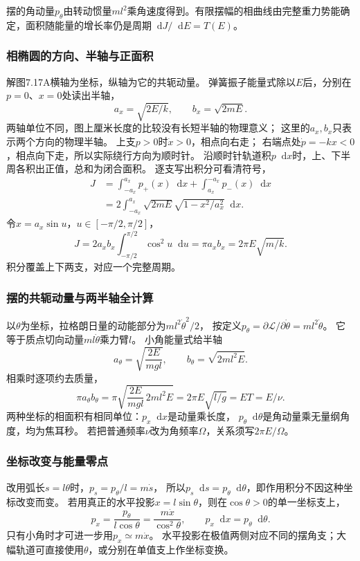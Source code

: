 \documentclass[UTF8,fontset=fandol,a4paper,11pt]{ctexart}
\newcommand{\dd}{\mathop{}\!\mathrm{d}}
\begin{document}
摆的角动量$p_\theta$由转动惯量$ml^2$乘角速度得到。有限摆幅的相曲线由完整重力势能确定，面积随能量的增长率仍是周期$\dd J/\dd E=T(E)$。
\subsubsection*{相椭圆的方向、半轴与正面积}
解图7.17A横轴为坐标，纵轴为它的共轭动量。
弹簧振子能量式除以$E$后，分别在$p=0$、$x=0$处读出半轴，
\[
a_x=\sqrt{2E/k},\qquad b_x=\sqrt{2mE}.
\]
两轴单位不同，图上厘米长度的比较没有长短半轴的物理意义；
这里的$a_x,b_x$只表示两个方向的物理半轴。
上支$p>0$时$\dot x>0$，相点向右走；
右端点处$\dot p=-kx<0$，相点向下走，所以实际绕行方向为顺时针。
沿顺时针轨道积$p\dd x$时，上、下半周各积出正值，总和为闭合面积。
逐支写出积分可看清符号，
\[
\begin{aligned}
J&=\int_{-a_x}^{a_x}p_+(x)\dd x+
\int_{a_x}^{-a_x}p_-(x)\dd x\\
&=2\int_{-a_x}^{a_x}\sqrt{2mE}\sqrt{1-x^2/a_x^2}\dd x.
\end{aligned}
\]
令$x=a_x\sin u$，$u\in[-\pi/2,\pi/2]$，
\[
J=2a_xb_x\int_{-\pi/2}^{\pi/2}\cos^2u\dd u
=\pi a_xb_x=2\pi E\sqrt{m/k}.
\]
积分覆盖上下两支，对应一个完整周期。

\subsubsection*{摆的共轭动量与两半轴全计算}
以$\theta$为坐标，拉格朗日量的动能部分为$ml^2\dot\theta^2/2$，
按定义$p_\theta=\partial\mathcal L/\partial\dot\theta=ml^2\dot\theta$。
它等于质点切向动量$ml\dot\theta$乘力臂$l$。
小角能量式给半轴
\[
a_\theta=\sqrt{\frac{2E}{mgl}},\qquad
b_\theta=\sqrt{2ml^2E}.
\]
相乘时逐项约去质量，
\[
\pi a_\theta b_\theta
=\pi\sqrt{\frac{2E}{mgl}\,2ml^2E}
=2\pi E\sqrt{l/g}=ET=E/\nu.
\]
两种坐标的相面积有相同单位：$p_x\dd x$是动量乘长度，
$p_\theta\dd\theta$是角动量乘无量纲角度，均为焦耳秒。
若把普通频率$\nu$改为角频率$\Omega$，关系须写$2\pi E/\Omega$。

\subsubsection*{坐标改变与能量零点}
改用弧长$s=l\theta$时，$p_s=p_\theta/l=m\dot s$，
所以$p_s\dd s=p_\theta\dd\theta$，即作用积分不因这种坐标改变而变。
若用真正的水平投影$x=l\sin\theta$，则在$\cos\theta>0$的单一坐标支上，
\[
p_x=\frac{p_\theta}{l\cos\theta}
=\frac{m\dot x}{\cos^2\theta},\qquad p_x\dd x=p_\theta\dd\theta.
\]
只有小角时才可进一步用$p_x\simeq m\dot x$。
水平投影在极值两侧对应不同的摆角支；大幅轨道可直接使用$\theta$，或分别在单值支上作坐标变换。
\end{document}
